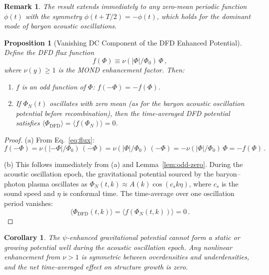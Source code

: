 \documentclass[12pt,a4paper]{article}
\newtheorem{proposition}[theorem]{Proposition}
\newtheorem{corollary}[theorem]{Corollary}
\newtheorem{remark}{Remark}
\begin{document}
\begin{remark}
The result extends immediately to any zero-mean periodic function
$\phi(t)$ with the symmetry $\phi(t + T/2) = -\phi(t)$, which holds
for the dominant mode of baryon acoustic oscillations.
\end{remark}

\begin{proposition}[Vanishing DC Component of the DFD Enhanced Potential]
\label{prop:odd-DFD}
Define the DFD flux function
\begin{equation}
\label{eq:flux}
f(\Phi) \equiv \nu(|\Phi|/\Phi_0)\,\Phi\,,
\end{equation}
where $\nu(y) \geq 1$ is the MOND enhancement factor. Then:
\begin{enumerate}
\item[(a)] $f$ is an odd function of $\Phi$: $f(-\Phi) = -f(\Phi)$.
\item[(b)] If $\Phi_N(t)$ oscillates with zero mean (as for the baryon
acoustic oscillation potential before recombination), then the
time-averaged DFD potential satisfies
$\langle\Phi_{\mathrm{DFD}}\rangle = \langle f(\Phi_N)\rangle = 0$.
\end{enumerate}
\end{proposition}

\begin{proof}
(a) From Eq.~\eqref{eq:flux}:
\begin{equation}
f(-\Phi) = \nu(|-\Phi|/\Phi_0)\,(-\Phi) = \nu(|\Phi|/\Phi_0)\,(-\Phi)
= -\nu(|\Phi|/\Phi_0)\,\Phi = -f(\Phi)\,.
\end{equation}

(b) This follows immediately from (a) and Lemma~\ref{lem:odd-zero}.
During the acoustic oscillation epoch, the gravitational potential
sourced by the baryon--photon plasma oscillates as
$\Phi_N(t, k) \approx A(k)\cos(c_s k\eta)$, where $c_s$ is the
sound speed and $\eta$ is conformal time. The time-average over one
oscillation period vanishes:
\begin{equation}
\langle\Phi_{\mathrm{DFD}}(t,k)\rangle
= \langle f(\Phi_N(t,k))\rangle = 0\,.
\end{equation}
\end{proof}

\begin{corollary}
\label{cor:no-potential-well}
The $\psi$-enhanced gravitational potential cannot form a static
or growing potential well during the acoustic oscillation epoch.
Any nonlinear enhancement from $\nu > 1$ is symmetric between
overdensities and underdensities, and the net time-averaged effect
on structure growth is zero.
\end{corollary}
\end{document}

